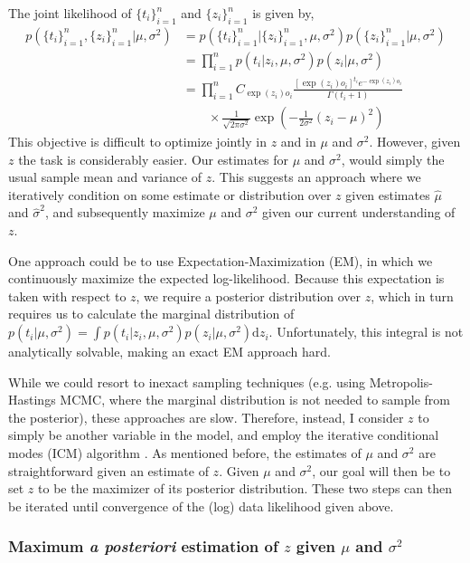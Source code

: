 \documentclass[11pt]{article}
\begin{document}
The joint likelihood of $\{t_i\}_{i=1}^n$ and $\{z_i\}_{i=1}^n$ is given by,
\begin{align*}
p(\{t_i\}_{i=1}^n, \{z_i\}_{i=1}^n | \mu, \sigma^2) & = p(\{t_i\}_{i=1}^n | \{z_i\}_{i=1}^n, \mu, \sigma^2)  p(\{z_i\}_{i=1}^n |\mu, \sigma^2)\\
& = \prod_{i=1}^n p(t_i | z_i, \mu, \sigma^2) p(z_i | \mu, \sigma^2) \\
& = \prod_{i=1}^n C_{\exp(z_i)o_i} \frac{ [\exp(z_i)o_i]^{t_i} e^{-\exp(z_i)o_i}}{\Gamma(t_i + 1)} \\ & \qquad \times \frac{1}{\sqrt{2\pi\sigma^2}} \exp\left( -\frac{1}{2\sigma^2}(z_i - \mu)^2 \right) 
\end{align*}
This objective is difficult to optimize jointly in $z$ and in $\mu$ and $\sigma^2$. However, given $z$ the task is considerably easier. Our estimates for $\mu$ and $\sigma^2$, would simply the usual sample mean and variance of $z$. This suggests an approach where we iteratively condition on some estimate or distribution over $z$ given estimates $\hat{\mu}$ and $\hat{\sigma}^2$, and subsequently maximize $\mu$ and $\sigma^2$ given our current understanding of $z$.

One approach could be to use Expectation-Maximization (EM), in which we continuously maximize the expected log-likelihood. Because this expectation is taken with respect to $z$, we require a posterior distribution over $z$, which in turn requires us to calculate the marginal distribution of $p(t_i | \mu, \sigma^2) = \int p(t_i | z_i, \mu, \sigma^2)p(z_i | \mu, \sigma^2) \textrm{d}z_i$. Unfortunately, this integral is not analytically solvable, making an exact EM approach hard.

While we could resort to inexact sampling techniques (e.g. using Metropolis-Hastings MCMC, where the marginal distribution is not needed to sample from the posterior), these approaches are slow. Therefore, instead, I consider $z$ to simply be another variable in the model, and employ the iterative conditional modes (ICM) algorithm \cite{Besag1986}. As mentioned before, the estimates of $\mu$ and $\sigma^2$ are straightforward given an estimate of $z$. Given $\mu$ and $\sigma^2$, our goal will then be to set $z$ to be the maximizer of its posterior distribution. These two steps can then be iterated until convergence of the (log) data likelihood given above.

\subsubsection{Maximum \emph{a posteriori} estimation of $z$ given $\mu$ and $\sigma^2$}
\end{document}

